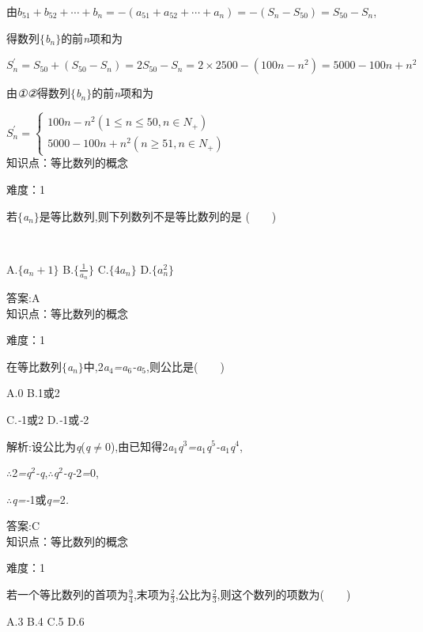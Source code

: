 \documentclass{article} %
\begin{document}
由$b_{51}+b_{52}+\cdots+b_n=-(a_{51}+a_{52}+\cdots+a_n)=-(S_n-S_{50})=S_{50}-S_n$,

得数列$\mathrm{\{}$\textit{b${}_{n}$}$\mathrm{\}}$的前\textit{n}项和为

$S_n^{'}=S_{50}+(S_{50}-S_n)=2S_{50}-S_n=2\times 2500-(100n-n^2)=5000-100n+n^2$

由\textit{①②}得数列$\mathrm{\{}$\textit{b${}_{n}$}$\mathrm{\}}$的前\textit{n}项和为

$S_n^{'}=\left\{
\begin{array}{l}
100n-n^2(1\le n\le 50, n\in N_{+}) \\
5000-100n+n^2(n\ge 51, n\in N_{+})
\end{array}
\right.$ \\

知识点：等比数列的概念

难度：1

 若$\mathrm{\{}$\textit{a${}_{n}$}$\mathrm{\}}$是等比数列,则下列数列不是等比数列的是 (\textit{　　})

 \textit{　　　　　　　　　　　　　　　　}

 A.$\{a_n+1\}$ B.$\{\frac{1}{a_n}\}$ C.$\{4a_n\}$ D.$\{a_n^2\}$

 答案:A \\

知识点：等比数列的概念

难度：1

 在等比数列$\mathrm{\{}$\textit{a${}_{n}$}$\mathrm{\}}$中,2\textit{a}${}_{4}$\textit{=a}${}_{6}$\textit{-a}${}_{5}$,则公比是(\textit{　　})

 A.0 B.1或2

 C.\textit{-}1或2 D.\textit{-}1或\textit{-}2

 解析:设公比为\textit{q}(\textit{q}$\mathrm{\neq}$0),由已知得2\textit{a}${}_{1}$\textit{q}${}^{3}$\textit{=a}${}_{1}$\textit{q}${}^{5}$\textit{-a}${}_{1}$\textit{q}${}^{4}$,

\textit{$\therefore$}2\textit{=q}${}^{2}$\textit{-q},\textit{$\therefore$q}${}^{2}$\textit{-q-}2\textit{=}0,

\textit{$\therefore$q=-}1或\textit{q=}2\textit{.}
 
 答案:C \\

知识点：等比数列的概念

难度：1

 若一个等比数列的首项为$\frac{9}{4}$,末项为$\frac{2}{3}$,公比为$\frac{2}{3}$,则这个数列的项数为(\textit{　　})

 A.3 B.4 C.5 D.6
\end{document}
